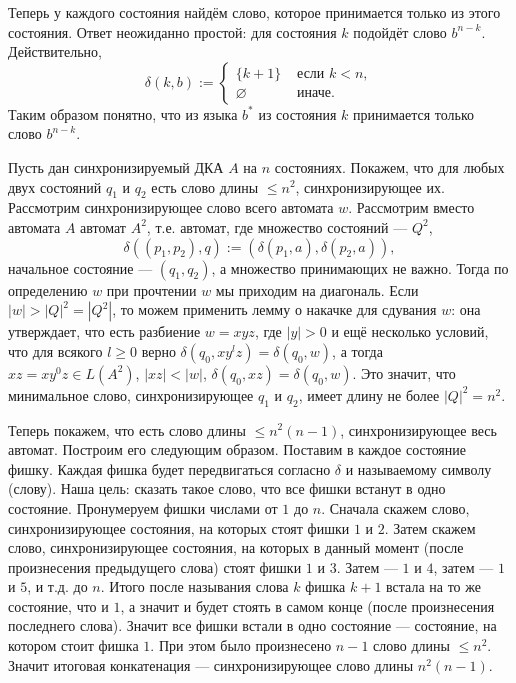 \documentclass[12pt,a4paper]{article}
\begin{document}
\begin{problem}{3}
        Теперь у каждого состояния найдём слово, которое принимается только из этого состояния. Ответ неожиданно простой: для состояния $k$ подойдёт слово $b^{n-k}$. Действительно,
        \[
            \delta(k, b) :=
            \begin{cases}
                \{k+1\}& \text{ если } k < n,\\
                \varnothing& \text{ иначе.}
            \end{cases}
        \]
        Таким образом понятно, что из языка $b^*$ из состояния $k$ принимается только слово $b^{n-k}$.
    \end{problem}

    \begin{problem}{4}
        Пусть дан синхронизируемый ДКА $A$ на $n$ состояниях. Покажем, что для любых двух состояний $q_1$ и $q_2$ есть слово длины $\leqslant n^2$, синхронизирующее их. Рассмотрим синхронизирующее слово всего автомата $w$. Рассмотрим вместо автомата $A$ автомат $A^2$, т.е. автомат, где множество состояний --- $Q^2$,
        \[\delta((p_1, p_2), q) := (\delta(p_1, a), \delta(p_2, a)),\]
        начальное состояние --- $(q_1, q_2)$, а множество принимающих не важно. Тогда по определению $w$ при прочтении $w$ мы приходим на диагональ. Если $|w| > |Q|^2 = |Q^2|$, то можем применить лемму о накачке для сдувания $w$: она утверждает, что есть разбиение $w = xyz$, где $|y| > 0$ и ещё несколько условий, что для всякого $l \geqslant 0$ верно $\delta(q_0, x y^l z) = \delta(q_0, w)$, а тогда $xz = x y^0 z \in L(A^2)$, $|xz| < |w|$, $\delta(q_0, xz) = \delta(q_0, w)$. Это значит, что минимальное слово, синхронизирующее $q_1$ и $q_2$, имеет длину не более $|Q|^2 = n^2$.

        Теперь покажем, что есть слово длины $\leqslant n^2(n-1)$, синхронизирующее весь автомат. Построим его следующим образом. Поставим в каждое состояние фишку. Каждая фишка будет передвигаться согласно $\delta$ и называемому символу (слову). Наша цель: сказать такое слово, что все фишки встанут в одно состояние. Пронумеруем фишки числами от $1$ до $n$. Сначала скажем слово, синхронизирующее состояния, на которых стоят фишки $1$ и $2$. Затем скажем слово, синхронизирующее состояния, на которых в данный момент (после произнесения предыдущего слова) стоят фишки $1$ и $3$. Затем --- $1$ и $4$, затем --- $1$ и $5$, и т.д. до $n$. Итого после называния слова $k$ фишка $k+1$ встала на то же состояние, что и $1$, а значит и будет стоять в самом конце (после произнесения последнего слова). Значит все фишки встали в одно состояние --- состояние, на котором стоит фишка $1$. При этом было произнесено $n-1$ слово длины $\leqslant n^2$. Значит итоговая конкатенация --- синхронизирующее слово длины $n^2(n-1)$.
    \end{problem}
\end{document}
